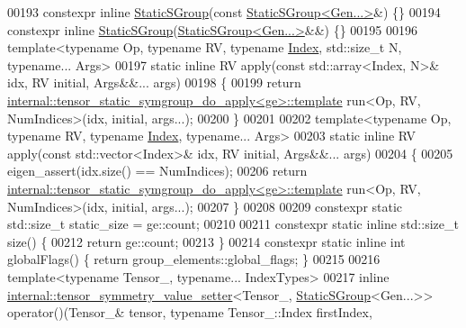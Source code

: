 \begin{DoxyCode}
00193     constexpr \textcolor{keyword}{inline} \hyperlink{class_eigen_1_1_static_s_group}{StaticSGroup}(\textcolor{keyword}{const} \hyperlink{class_eigen_1_1_static_s_group}{StaticSGroup<Gen...>}&) \{\}
00194     constexpr \textcolor{keyword}{inline} \hyperlink{class_eigen_1_1_static_s_group}{StaticSGroup}(\hyperlink{class_eigen_1_1_static_s_group}{StaticSGroup<Gen...>}&&) \{\}
00195 
00196     \textcolor{keyword}{template}<\textcolor{keyword}{typename} Op, \textcolor{keyword}{typename} RV, \textcolor{keyword}{typename} \hyperlink{namespace_eigen_a62e77e0933482dafde8fe197d9a2cfde}{Index}, std::size\_t N, \textcolor{keyword}{typename}... Args>
00197     \textcolor{keyword}{static} \textcolor{keyword}{inline} RV apply(\textcolor{keyword}{const} std::array<Index, N>& idx, RV initial, Args&&... args)
00198     \{
00199       \textcolor{keywordflow}{return} \hyperlink{struct_eigen_1_1internal_1_1tensor__static__symgroup__do__apply}{internal::tensor\_static\_symgroup\_do\_apply<ge>::template}
       run<Op, RV, NumIndices>(idx, initial, args...);
00200     \}
00201 
00202     \textcolor{keyword}{template}<\textcolor{keyword}{typename} Op, \textcolor{keyword}{typename} RV, \textcolor{keyword}{typename} \hyperlink{namespace_eigen_a62e77e0933482dafde8fe197d9a2cfde}{Index}, \textcolor{keyword}{typename}... Args>
00203     \textcolor{keyword}{static} \textcolor{keyword}{inline} RV apply(\textcolor{keyword}{const} std::vector<Index>& idx, RV initial, Args&&... args)
00204     \{
00205       eigen\_assert(idx.size() == NumIndices);
00206       \textcolor{keywordflow}{return} \hyperlink{struct_eigen_1_1internal_1_1tensor__static__symgroup__do__apply}{internal::tensor\_static\_symgroup\_do\_apply<ge>::template}
       run<Op, RV, NumIndices>(idx, initial, args...);
00207     \}
00208 
00209     constexpr \textcolor{keyword}{static} std::size\_t static\_size = ge::count;
00210 
00211     constexpr \textcolor{keyword}{static} \textcolor{keyword}{inline} std::size\_t size() \{
00212       \textcolor{keywordflow}{return} ge::count;
00213     \}
00214     constexpr \textcolor{keyword}{static} \textcolor{keyword}{inline} \textcolor{keywordtype}{int} globalFlags() \{ \textcolor{keywordflow}{return} group\_elements::global\_flags; \}
00215 
00216     \textcolor{keyword}{template}<\textcolor{keyword}{typename} Tensor\_, \textcolor{keyword}{typename}... IndexTypes>
00217     \textcolor{keyword}{inline} \hyperlink{class_eigen_1_1internal_1_1tensor__symmetry__value__setter}{internal::tensor\_symmetry\_value\_setter}<Tensor\_, 
      \hyperlink{class_eigen_1_1_static_s_group}{StaticSGroup}<Gen...>> operator()(Tensor\_& tensor, \textcolor{keyword}{typename} Tensor\_::Index firstIndex, 

\end{DoxyCode}
